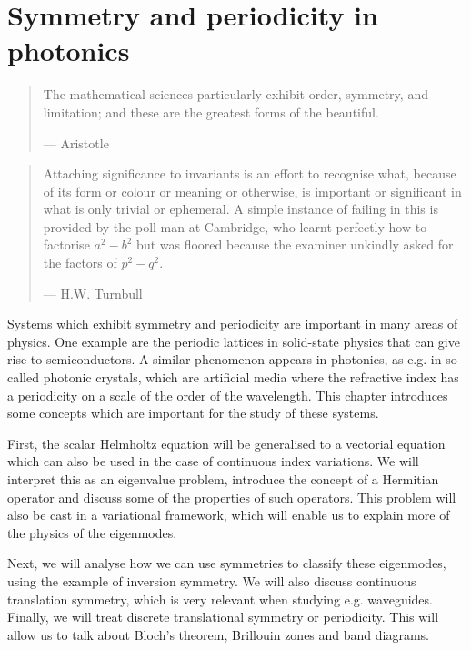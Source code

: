 \chapter{Symmetry and periodicity in photonics}
\label{h:periodic}

\begin{quote}
The mathematical sciences particularly exhibit order, symmetry, and limitation; and these are the greatest forms of the beautiful.

--- Aristotle
\end{quote}

\begin{quote}
Attaching significance to invariants is an effort to recognise what, because of its form or colour or meaning or otherwise, is important or significant in what is only trivial or ephemeral. A simple instance of failing in this is provided by the poll-man at Cambridge, who learnt perfectly how to factorise $a^2 - b^2$ but was floored because the examiner unkindly asked for the factors of $p^2 - q^2$.

--- H.W. Turnbull
\end{quote}

\chaptertoc

Systems which exhibit symmetry and periodicity are important in many areas of physics. One example are the periodic lattices in solid-state physics that can give rise to semiconductors. A similar phenomenon appears in photonics, as e.g. in so--called photonic crystals, which are artificial media where the refractive index has a periodicity on a scale of the order of the wavelength. This chapter introduces some concepts which are important for the study of these systems.

First, the scalar Helmholtz equation will be generalised to a vectorial equation which can also be used in the case of continuous index variations. We will interpret this as an eigenvalue problem, introduce the concept of a Hermitian operator and discuss some of the properties of such operators. This problem will also be cast in a variational framework, which will enable us to explain more of the physics of the eigenmodes.

Next, we will analyse how we can use symmetries to classify these eigenmodes, using the example of inversion symmetry. We will also discuss continuous translation symmetry, which is very relevant when studying e.g. waveguides. Finally, we will treat discrete translational symmetry or periodicity. This will allow us to talk about Bloch's theorem, Brillouin zones and band diagrams. 

